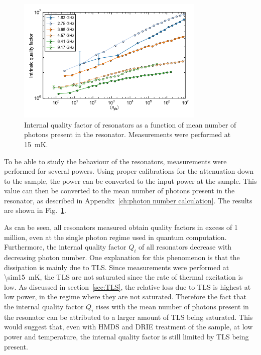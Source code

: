 \begin{figure}
    \centering
    \includegraphics[width=0.8\textwidth]{Figures/DRIE/Qi_vs_n_photon.png}
    \caption{Internal quality factor of resonators as a function of mean number of photons present in the resonator. Measurements were performed at \SI{15}{\milli \kelvin}.}
    \label{fig:Qi_vs_n_photon}
\end{figure}
To be able to study the behaviour of the resonators, measurements were performed for several powers. Using proper calibrations for the attenuation down to the sample, the power can be converted to the input power at the sample. This value can then be converted to the mean number of photons present in the resonator, as described in Appendix~\ref{ch:photon number calculation}. The results are shown in Fig.~\ref{fig:Qi_vs_n_photon}.

As can be seen, all resonators measured obtain quality factors in excess of 1 million, even at the single photon regime used in quantum computation. Furthermore, the internal quality factor $Q_i$ of all resonators decrease with decreasing photon number. One explanation for this phenomenon is that the dissipation is mainly due to TLS. Since measurements were performed at \SI{\sim15}{mK}, the TLS are not saturated since the rate of thermal excitation is low. As discussed in section~\ref{sec:TLS}, the relative loss due to TLS is highest at low power, in the regime where they are not saturated. Therefore the fact that the internal quality factor $Q_i$ rises with the mean number of photons present in the resonator can be attributed to a larger amount of TLS being saturated. This would suggest that, even with HMDS and DRIE treatment of the sample, at low power and temperature, the internal quality factor is still limited by TLS being present.

